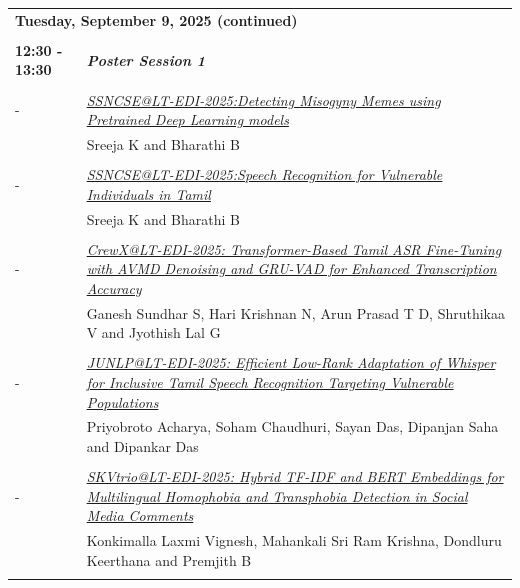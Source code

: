 \documentclass[11pt,oneside]{book}
\begin{document}
    \newpage
          \begin{tabular}{p{24mm}p{124mm}}
    \multicolumn{2}{l}{\bf Tuesday, September 9, 2025 (continued)} \\\\
                \textbf{12:30 - 13:30} & \emph{\textbf{Poster Session 1}}\\\\
      
                
                       -  & \hyperlink{page.1}{\emph{SSNCSE@LT-EDI-2025:Detecting Misogyny Memes using Pretrained Deep Learning models}}\\
        & Sreeja K\index{K} and Bharathi B\index{B}\\\\
                
                       -  & \hyperlink{page.6}{\emph{SSNCSE@LT-EDI-2025:Speech Recognition for Vulnerable Individuals in Tamil}}\\
        & Sreeja K\index{K} and Bharathi B\index{B}\\\\
                
                       -  & \hyperlink{page.11}{\emph{CrewX@LT-EDI-2025: Transformer-Based Tamil ASR Fine-Tuning with AVMD Denoising and GRU-VAD for Enhanced Transcription Accuracy}}\\
        & Ganesh Sundhar S\index{S}, Hari Krishnan N\index{N}, Arun Prasad T D\index{D}, Shruthikaa V\index{V} and Jyothish Lal G\index{G}\\\\
                
                       -  & \hyperlink{page.17}{\emph{JUNLP@LT-EDI-2025: Efficient Low-Rank Adaptation of Whisper for Inclusive Tamil Speech Recognition Targeting Vulnerable Populations}}\\
        & Priyobroto Acharya\index{Acharya}, Soham Chaudhuri\index{Chaudhuri}, Sayan Das\index{Das}, Dipanjan Saha\index{Saha} and Dipankar Das\index{Das}\\\\
                
                       -  & \hyperlink{page.26}{\emph{SKVtrio@LT-EDI-2025: Hybrid TF-IDF and BERT Embeddings for  Multilingual Homophobia and Transphobia Detection in Social Media  Comments}}\\
        & Konkimalla Laxmi Vignesh\index{Vignesh}, Mahankali Sri Ram Krishna\index{Krishna}, Dondluru Keerthana\index{Keerthana} and Premjith B\index{B}\\\\
                

\end{tabular}
\end{document}
